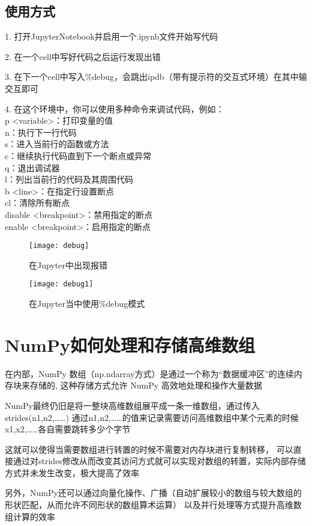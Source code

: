 \documentclass[10pt]{article}
\begin{document}
	\subsection{使用方式}
	1. 打开JupyterNotebook并启用一个.ipynb文件开始写代码\par
	2. 在一个cell中写好代码之后运行发现出错\par
	3. 在下一个cell中写入\%debug，会跳出ipdb（带有提示符的交互式环境）在其中输交互即可\par
	4. 在这个环境中，你可以使用多种命令来调试代码，例如：\\
	p <variable>：打印变量的值\\
	n：执行下一行代码\\
	s：进入当前行的函数或方法\\
	c：继续执行代码直到下一个断点或异常\\
	q：退出调试器\\
	l：列出当前行的代码及其周围代码\\
	b <line>：在指定行设置断点\\
	cl：清除所有断点\\
	disable <breakpoint>：禁用指定的断点\\
	enable <breakpoint>：启用指定的断点\\
	\begin{figure}[H]
		\centering
		\texttt{[image: debug]}
		\caption{在Jupyter中出现报错}
	\end{figure}
	\begin{figure}[H]
		\centering
		\texttt{[image: debug1]}
		\caption{在Jupyter当中使用\%debug模式}
	\end{figure}
	
	\section{NumPy如何处理和存储高维数组}
	在内部，NumPy 数组（np.ndarray方式）是通过一个称为“数据缓冲区”的连续内存块来存储的,
	这种存储方式允许 NumPy 高效地处理和操作大量数据\par
	NumPy最终仍旧是将一整块高维数组展平成一条一维数组，通过传入strides(n1,n2,……)
	通过n1,n2,……的值来记录需要访问高维数组中某个元素的时候x1,x2,……各自需要跳转多少个字节\par
	这就可以使得当需要数组进行转置的时候不需要对内存块进行复制转移，
	可以直接通过对strides修改从而改变其访问方式就可以实现对数组的转置，实际内部存储方式并未发生改变，极大提高了效率\par
	另外，NumPy还可以通过向量化操作、广播（自动扩展较小的数组与较大数组的形状匹配，从而允许不同形状的数组算术运算）
	以及并行处理等方式提升高维数组计算的效率
	
\end{document}
